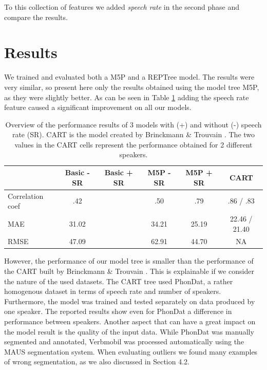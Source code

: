\documentclass[a4paper]{scrreprt}
\begin{document}
To this collection of features we added \textit{speech rate} in the second phase and compare the results. 

\section{Results}
We trained and evaluated both a M5P and a REPTree model. The results were very similar, so present here only the results obtained using the model tree M5P, as they were slightly better. As can be seen in Table \ref{tab:perfM} adding the speech rate feature caused a significant improvement on all our models. 

\begin{table}[htbp]
\centering
\begin{tabular}{|l|c|c|c|c|c|}

\hline
	 & Basic - SR & Basic + SR & M5P - SR & M5P + SR & CART\\
\hline
\hline
Correlation coef 		& .42  &  & .50 & .79 & .86 / .83\\
	\hline
MAE  &  31.02 & & 34.21 & 25.19 & 22.46 / 21.40\\
	\hline
RMSE  &  47.09 & & 62.91 & 44.70 & NA \\
	\hline

\end{tabular}
\caption{Overview of the performance results of 3 models with (+) and without (-) speech rate (SR). CART is the model created by Brinckmann \& Trouvain \cite{Brinckmann_2003}. The two values in the CART cells represent the performance obtained for 2 different speakers.} 
\label{tab:perfM}
\end{table}

However, the performance of our model tree is smaller than the performance of the CART built by Brinckmann \& Trouvain \cite{Brinckmann_2003}. This is explainable if we consider the nature of the used datasets. The CART tree used PhonDat, a rather homogenous dataset in terms of speech rate and number of speakers. Furthermore, the model was trained and tested separately on data produced by one speaker. The reported results show even for PhonDat a difference in performance between speakers. Another aspect that can have a great impact on the model result is the quality of the input data. While PhonDat was manually segmented and annotated, Verbmobil was processed automatically using the MAUS segmentation system. When evaluating outliers we found many examples of wrong segmentation, as we also discussed in Section 4.2.
\end{document}
